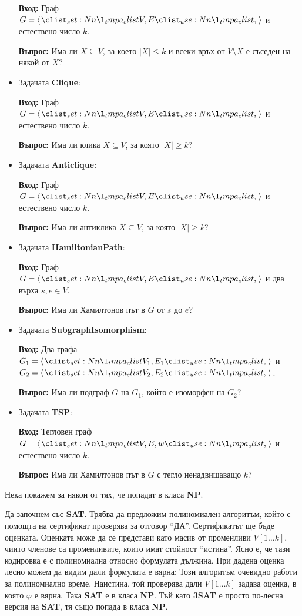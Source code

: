 \begin{itemize}
            \textbf{Вход:} Граф $G = \opair{V, E}$ и естествено число $k$.

            \textbf{Въпрос:} Има ли $X \subseteq V$, за което $|X| \leq k$ и всеки връх от $V \setminus X$ е съседен на някой от $X$?
      \item Задачата \textbf{Clique}:

            \textbf{Вход:} Граф $G = \opair{V, E}$ и естествено число $k$.

            \textbf{Въпрос:} Има ли клика $X \subseteq V$, за която $|X| \geq k$?
      \item Задачата \textbf{Anticlique}:

            \textbf{Вход:} Граф $G = \opair{V, E}$ и естествено число $k$.

            \textbf{Въпрос:} Има ли антиклика $X \subseteq V$, за която $|X| \geq k$?
      \item Задачата \textbf{HamiltonianPath}:

            \textbf{Вход:} Граф $G = \opair{V, E}$ и два върха $s, e \in V$.

            \textbf{Въпрос:} Има ли Хамилтонов път в $G$ от $s$ до $e$?
      \item Задачата \textbf{SubgraphIsomorphism}:

            \textbf{Вход:} Два графа $G_1 = \opair{V_1, E_1}$ и $G_2 = \opair{V_2, E_2}$.

            \textbf{Въпрос:} Има ли подграф $G$ на $G_1$, който е изоморфен на $G_2$?
      \item Задачата \textbf{TSP}:

            \textbf{Вход:} Тегловен граф $G = \opair{V, E, w}$ и естествено число $k$.

            \textbf{Въпрос:} Има ли Хамилтонов път в $G$ с тегло ненадвишаващо $k$?
\end{itemize}

Нека покажем за някои от тях, че попадат в класа \textbf{NP}.

Да започнем със \textbf{SAT}.
Трябва да предложим полиномиален алгоритъм, който с помощта на сертификат проверява за отговор ``ДА''.
Сертификатът ще бъде оценката.
Оценката може да се представи като масив от променливи $V[1 \dots k]$, чиито членове са променливите, които имат стойност ``истина''.
Ясно е, че тази кодировка е с полиномиална относно формулата дължина.
При дадена оценка лесно можем да видим дали формулата е вярна:
Този алгоритъм очевидно работи за полиномиално време.
Наистина, той проверява дали $V[1 \dots k]$ задава оценка, в която $\varphi$ е вярна.
Така \textbf{SAT} е в класа \textbf{NP}.
Тъй като \textbf{3SAT} е просто по-лесна версия на \textbf{SAT}, тя също попада в класа \textbf{NP}.


